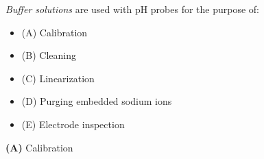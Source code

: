 

{\it Buffer solutions} are used with pH probes for the purpose of:

\begin{itemize}
\item{(A)} Calibration
\vskip 5pt 
\item{(B)} Cleaning
\vskip 5pt 
\item{(C)} Linearization
\vskip 5pt 
\item{(D)} Purging embedded sodium ions
\vskip 5pt 
\item{(E)} Electrode inspection
\end{itemize}







{\bf (A)} Calibration
 









